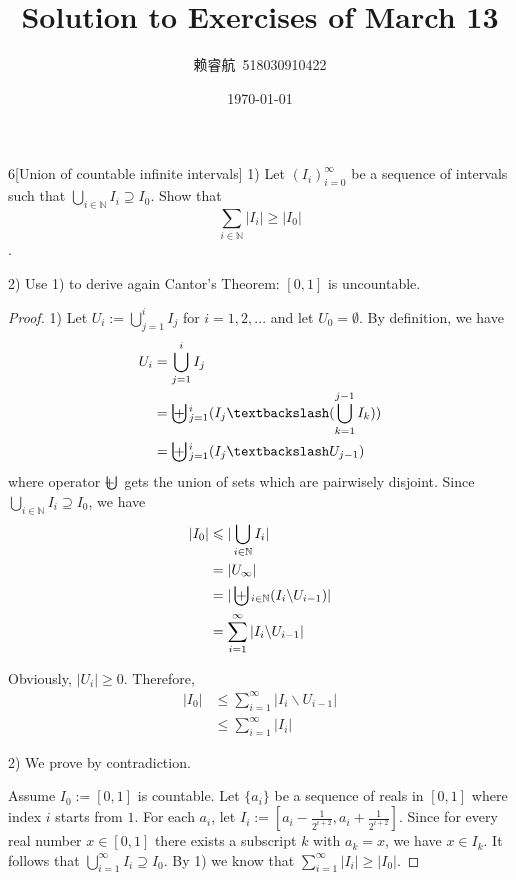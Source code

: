 \documentclass[a4paper, linespread=1.5]{article}
\newcommand{\Natural}{\mathbb{N}}
\newcommand{\addbigcup}{\bigcup{\kern-1.12em{+}}\kern0.3em}
\begin{document}
    \title{Solution to Exercises of March 13}
    \author{赖睿航\ 518030910422}
    \date{\today}
    \maketitle
    
    \begin{customex}{6}[Union of countable infinite intervals]
        1) Let $(I_i)_{i = 0}^\infty$ be a sequence of intervals such that $\bigcup_{i \in \Natural} I_i \supseteq I_0$. Show that $$ \sum_{i \in \Natural} |I_i| \geqslant |I_0| $$.
        
        2) Use 1) to derive again Cantor's Theorem: $[0, 1]$ is uncountable.
    \end{customex}

    \begin{proof}
        1) Let $U_i := \bigcup_{j=1}^i I_j$ for $i = 1, 2, ...$ and let $U_0 = \emptyset$. By definition, we have
        \begin{align*}
            U_i &= \bigcup_{j = 1}^i I_j \\
            &= \addbigcup _{j = 1}^i (I_j \textbackslash (\bigcup_{k = 1}^{j - 1} I_k)) \\
            &= \addbigcup _{j = 1}^i (I_j \textbackslash U_{j - 1})
        \end{align*}
        where operator $\addbigcup$ gets the union of sets which are pairwisely disjoint. Since $\bigcup_{i \in \Natural} I_i \supseteq I_0$, we have
        \begin{align*}
            |I_0| &\leqslant |\bigcup_{i \in \Natural} I_i| \\
            &= | U_\infty | \\ 
            &= | \addbigcup_{i \in \Natural} (I_i \backslash U_{i - 1}) | \\
            &= \sum_{i = 1}^\infty | I_i \backslash U_{i - 1} |
        \end{align*}
        
        Obviously, $|U_i| \geqslant 0$. Therefore, 
        \begin{align*}
            |I_0| &\leqslant \sum_{i = 1}^\infty | I_i \backslash U_{i - 1} | \\
            &\leqslant \sum_{i = 1}^\infty |I_i|
        \end{align*}
        
        2) We prove by contradiction. 
        
        Assume $I_0 := [0, 1]$ is countable. Let $\{a_i\}$ be a sequence of reals in $[0, 1]$ where index $i$ starts from $1$. For each $a_i$, let $I_i := [a_i - \frac{1}{2^{i + 2}}, a_i + \frac{1}{2^{i + 2}}]$. Since for every real number $x \in [0, 1]$ there exists a subscript $k$ with $a_k = x$, we have $x \in I_k$. It follows that $\bigcup_{i = 1}^\infty I_i \supseteq I_0$. By 1) we know that $\sum_{i = 1}^\infty |I_i| \geqslant |I_0|$.
        

\end{proof}
\end{document}
